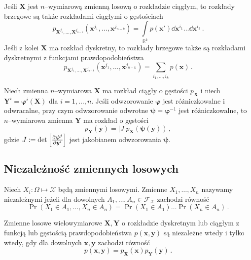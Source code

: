 \documentclass{myclass}
\numberwithin{equation}{subsection}
\begin{document}
Jeśli \(\bm{X}\) jest \(n\)--wymiarową zmienną losową o rozkładzie ciągłym, to rozkłady brzegowe są
także rozkładami ciągłymi o gęstościach
\begin{equation}
    p_{\bm{X}^{j_1},\ldots,\bm{X}^{j_{n-k}}}(\bm{x}^{j_1},\ldots,\bm{x}^{j_{n-k}}) = \int\limits_{\mathbb{R}^k} p(\bm{x}') \dd{\bm{x}^{i_1}}\ldots\dd{\bm{x}^{i_k}}\,.
\end{equation}
Jeśli z kolei \(\bm{X}\) ma rozkład dyskretny, to rozkłady brzegowe także są rozkładami dyskretnymi
z funkcjami prawdopodobieństwa
\begin{equation}
    p_{\bm{X}^{j_1},\ldots,\bm{X}^{j_{n-k}}}(\bm{x}^{j_1},\ldots,\bm{x}^{j_{n-k}}) = \sum_{i_1,\ldots,i_k}p(\bm{x})\,.
\end{equation}

\begin{theorem}
Niech zmienna \(n\)--wymiarowa \(\bm{X}\) ma rozkład ciągły o gęstości \(p_{\bm{X}}\) i niech
\(\bm{Y}^i = \bm{\varphi}^i(\bm{X})\) dla \(i=1,\ldots,n\). Jeśli odwzorowanie \(\bm{\varphi}\) jest
różniczkowalne i odwracalne, przy czym odwzorowanie odwrotne \(\bm{\psi} = \bm{\varphi}^{-1}\) jest
różniczkowalne, to \(n\)--wymiarowa zmienna \(\bm{Y}\) ma rozkład o gęstości
\begin{equation*}
    p_{\bm{Y}}(\bm{y}) = |J| p_{\bm{X}}(\bm{\psi}(\bm{y}))\,,
\end{equation*}
gdzie \(J := \det \left[\pdv{\bm{\psi}^j}{\bm{y}^i}\right]\) jest jakobianem odwzorowania
\(\bm{\psi}\).
\end{theorem}


\subsection{Niezależność zmiennych losowych}

\begin{definition}
Niech \(X_i : \Omega \mapsto \mathcal{X}\) będą zmiennymi losowymi. Zmienne \(X_1,\ldots,X_n\)
nazywamy niezależnymi jeżeli dla dowolnych \(A_1,\ldots,A_n \in \mathcal{F}_\mathcal{X}\) zachodzi
równość
\begin{equation*}
    \Pr(X_1 \in A_1, \ldots, X_n \in A_n) = \Pr(X_1 \in A_1) \ldots \Pr(X_n \in A_n)\,.
\end{equation*}
\end{definition}

\begin{theorem}
Zmienne losowe wielowymiarowe \(\bm{X}, \bm{Y}\) o rozkładzie dyskretnym lub ciągłym z funkcją lub
gęstością prawdopodobieństwa \(p(\bm{x},\bm{y})\) są niezależne wtedy i tylko wtedy, gdy dla
dowolnych \(\bm{x}, \bm{y}\) zachodzi równość
\begin{equation*}
    p(\bm{x}, \bm{y}) = p_{\bm{X}}(\bm{x}) p_{\bm{Y}}(\bm{y})\,.    
\end{equation*}
\end{theorem}
\end{document}
